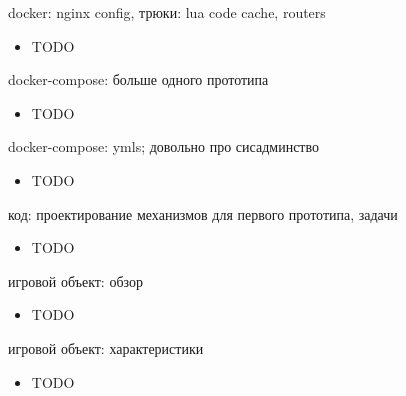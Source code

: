 \documentclass[aspectratio=169,handout,bigger]{beamer}
\begin{document}

\begin{frame}{docker: nginx config, трюки: lua code cache, routers}
  \begin{itemize}
    \item TODO
  \end{itemize}
\end{frame}


\begin{frame}{docker-compose: больше одного прототипа}
  \begin{itemize}
    \item TODO
  \end{itemize}
\end{frame}


\begin{frame}{docker-compose: ymls; довольно про сисадминство}
  \begin{itemize}
    \item TODO
  \end{itemize}
\end{frame}


\begin{frame}{код: проектирование механизмов для первого прототипа, задачи}
  \begin{itemize}
    \item TODO
  \end{itemize}
\end{frame}


\begin{frame}{игровой объект: обзор}
  \begin{itemize}
    \item TODO
  \end{itemize}
\end{frame}


\begin{frame}{игровой объект: характеристики}
  \begin{itemize}
    \item TODO
  \end{itemize}
\end{frame}
\end{document}
